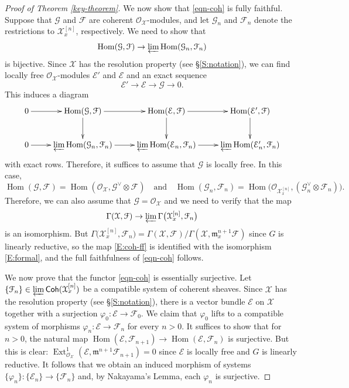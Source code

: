\documentclass[a4paper]{amsart}
\theoremstyle{plain}
\theoremstyle{definition}
\theoremstyle{remark}
\numberwithin{equation}{section}
\newcommand{\fm}{\mathfrak{m}}
\newcommand\cE{\mathcal{E}}
\newcommand\cF{\mathcal{F}}
\newcommand\cX{\mathcal{X}}
\newcommand\oh{\mathcal{O}}
\newcommand\Coh{\mathsf{Coh}}
\newcommand{\ilim}{\varprojlim}
\DeclareMathOperator{\Hom}{Hom}
\DeclareMathOperator{\Ext}{Ext}
\newcommand{\shv}[1]{\mathcal{{#1}}}
\begin{document}
\begin{proof}[Proof of Theorem \ref{key-theorem}]
  We now show that \eqref{eqn-coh} is fully faithful.  Suppose that $\shv{G}$ and $\shv{F}$ are coherent
  $\oh_{\cX}$-modules, and let $\shv{G}_n$ and $\shv{F}_n$ denote
  the restrictions to $\cX_x^{[n]}$, respectively. We need to show
  that
  \begin{equation*}
    \Hom(\shv{G}, \shv{F}) \to \ilim \Hom(\shv{G}_n, \shv{F}_n)
  \end{equation*}
  is bijective. Since $\cX$ has the resolution
  property (see \S\ref{S:notation}), we can find locally free $\oh_{\cX}$-modules
  $\cE'$ and $\cE$ and an exact sequence
  \[
\cE' \to \cE \to \shv{G} \to 0.
  \]
  This induces a diagram
  \[
  \xymatrix{
    0 \ar[r]		& \Hom(\shv{G}, \shv{F}) \ar[r] \ar[d]		& \Hom(\cE, \shv{F}) \ar[r] \ar[d]				& \Hom(\cE', \shv{F}) \ar[d]\\
    0 \ar[r] & \ilim \Hom(\shv{G}_n, \shv{F}_n) \ar[r] &
    \ilim \Hom(\cE_n, \shv{F}_n) \ar[r] & \ilim
    \Hom(\cE'_n, \shv{F}_n) }
  \]
  with exact rows.  Therefore, it suffices to assume that $\shv{G}$ is
  locally free.  In this case,
  \[
  \Hom(\shv{G}, \shv{F}) = \Hom(\oh_{\cX}, \shv{G}^{\vee} \otimes
  \shv{F}) \quad \text{and} \quad 
  \Hom(\shv{G}_n, \shv{F}_n) = \Hom\bigl(\oh_{\cX_x^{[n]}},
  (\shv{G}_n^{\vee} \otimes \shv{F}_n)\bigr).
  \]
Therefore, we can also assume that $\shv{G} = \oh_{\cX}$ and we need to verify that the map
  \begin{equation}\label{E:coh-ff}
    \Gamma(\cX,\shv{F}) \to \ilim
    \Gamma\bigl(\cX_x^{[n]},\shv{F}_n\bigr)
  \end{equation}
  is an isomorphism. But 
  $\Gamma\bigl(\cX_x^{[n]},\shv{F}_n\bigr)=
  \Gamma(\cX,\shv{F})/\Gamma(\cX,\fm_x^{n+1}\shv{F})$
  since $G$ is linearly reductive,
  so the map \eqref{E:coh-ff} is identified with the isomorphism \eqref{E:formal}, and the full faithfulness of \eqref{eqn-coh} follows.

  We now prove that the functor
  \eqref{eqn-coh} is essentially surjective. Let $\{\cF_n\} \in \ilim
  \Coh(\cX_x^{[n]})$ be a compatible system of coherent sheaves.
  Since $\cX$ has the
  resolution property (see \S\ref{S:notation}), there is a vector bundle $\shv{E}$ on $\cX$
  together with a surjection $\varphi_0\colon \shv{E} \to \shv{F}_0$. We
  claim that $\varphi_0$ lifts to a compatible system of morphisms
  $\varphi_n \colon \shv{E} \to \shv{F}_n$ for every $n>0$. 
  It suffices to show that for $n>0$, the natural map $\Hom(\cE, \cF_{n+1}) \to \Hom(\cE, \cF_n)$ is surjective. But this is clear: $\Ext_{\oh_{\cX}}^{1}(\cE, \fm^{n+1} \cF_{n+1}) = 0$ since $\cE$ is locally free and $G$ is linearly reductive. It follows that we obtain an induced morphism of systems
  $\{\varphi_n\} \colon \{\cE_n\} \to
  \{\cF_n\}$ and, by Nakayama's Lemma, each $\varphi_n$ is surjective.


\end{proof}
\end{document}
